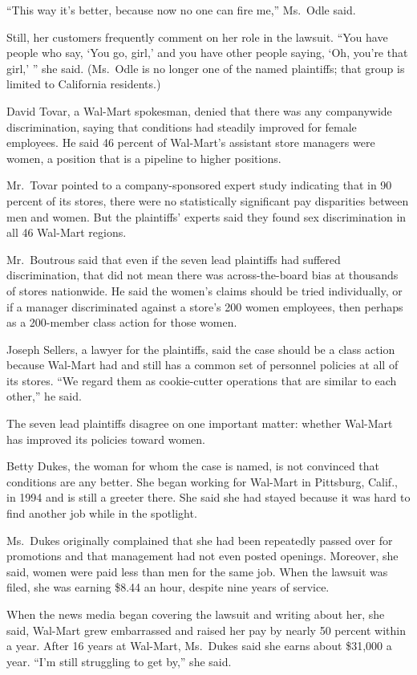 ﻿\documentclass[12pt]{article}
\begin{document}
``This way it's better, because now no one can fire me,'' Ms.~Odle said.

Still, her customers frequently comment on her role in the lawsuit. ``You have people who say, `You
go, girl,' and you have other people saying, `Oh, you're that girl,' '' she said. (Ms.~Odle is no
longer one of the named plaintiffs; that group is limited to California residents.)

David Tovar, a Wal-Mart spokesman, denied that there was any companywide discrimination, saying that
conditions had steadily improved for female employees. He said 46 percent of Wal-Mart's assistant
store managers were women, a position that is a pipeline to higher positions.

Mr.~Tovar pointed to a company-sponsored expert study indicating that in 90 percent of its stores,
there were no statistically significant pay disparities between men and women. But the plaintiffs'
experts said they found sex discrimination in all 46 Wal-Mart regions.

Mr.~Boutrous said that even if the seven lead plaintiffs had suffered discrimination, that did not
mean there was across-the-board bias at thousands of stores nationwide. He said the women's claims
should be tried individually, or if a manager discriminated against a store's 200 women employees,
then perhaps as a 200-member class action for those women.

Joseph Sellers, a lawyer for the plaintiffs, said the case should be a class action because Wal-Mart
had and still has a common set of personnel policies at all of its stores. ``We regard them as
cookie-cutter operations that are similar to each other,'' he said.

The seven lead plaintiffs disagree on one important matter: whether Wal-Mart has improved its
policies toward women.

Betty Dukes, the woman for whom the case is named, is not convinced that conditions are any better.
She began working for Wal-Mart in Pittsburg, Calif., in 1994 and is still a greeter there. She said
she had stayed because it was hard to find another job while in the spotlight.

Ms.~Dukes originally complained that she had been repeatedly passed over for promotions and that
management had not even posted openings. Moreover, she said, women were paid less than men for the
same job. When the lawsuit was filed, she was earning \$8.44 an hour, despite nine years of service.

When the news media began covering the lawsuit and writing about her, she said, Wal-Mart grew
embarrassed and raised her pay by nearly 50 percent within a year. After 16 years at Wal-Mart,
Ms.~Dukes said she earns about \$31,000 a year. ``I'm still struggling to get by,'' she said.
\end{document}
